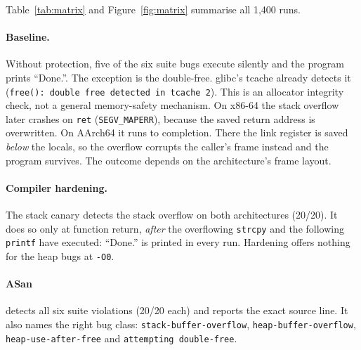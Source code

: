 \documentclass[11pt,a4paper]{article}
\begin{document}
Table~\ref{tab:matrix} and Figure~\ref{fig:matrix} summarise all 1{,}400 runs.

\paragraph{Baseline.}
Without protection, five of the six suite bugs execute silently and the program prints ``Done.''.
The exception is the double-free.
glibc's tcache already detects it (\texttt{free(): double free detected in tcache 2}).
This is an allocator integrity check, not a general memory-safety mechanism.
On x86-64 the stack overflow later crashes on \texttt{ret} (\texttt{SEGV\_MAPERR}), because the saved return address is overwritten.
On AArch64 it runs to completion.
There the link register is saved \emph{below} the locals, so the overflow corrupts the caller's frame instead and the program survives.
The outcome depends on the architecture's frame layout.

\paragraph{Compiler hardening.}
The stack canary detects the stack overflow on both architectures (20/20).
It does so only at function return, \emph{after} the overflowing \texttt{strcpy} and the following \texttt{printf} have executed: ``Done.'' is printed in every run.
Hardening offers nothing for the heap bugs at \texttt{-O0}.

\paragraph{ASan} detects all six suite violations (20/20 each) and reports the exact source line.
It also names the right bug class: \texttt{stack-buffer-overflow}, \texttt{heap-buffer-overflow}, \texttt{heap-use-after-free} and \texttt{attempting double-free}.
\end{document}
